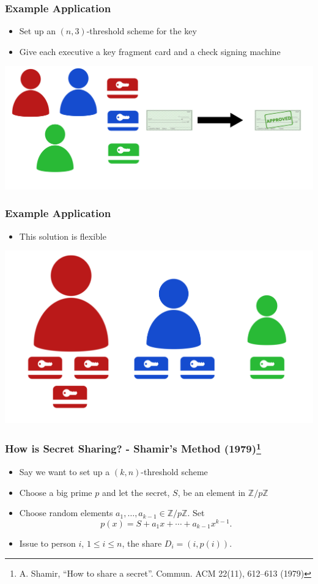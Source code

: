 \documentclass{beamer}
\newcommand{\integers}{\mathbb{Z}}
\begin{document}
\begin{frame}
	\frametitle{Example Application}
	\begin{itemize}
		\item Set up an $(n,3)$-threshold scheme for the key\pause
		\item Give each executive a key fragment card and a check signing machine\pause
	\end{itemize}
	\vspace{1cm}
	\centering
	\includegraphics[scale=.3]{three_execs.png}
\end{frame}

\begin{frame}
	\frametitle{Example Application}
	\begin{itemize}
		\item This solution is flexible\pause
	\end{itemize}
	\vspace{1cm}
	\centering
	\includegraphics[scale=.2]{exec_levels.png}
\end{frame}

\begin{frame}
	\frametitle{How is Secret Sharing? - Shamir's Method (1979)\footnote{A. Shamir, ``How to share a secret''. Commun. ACM 22(11), 612–613 (1979)}}
	\begin{itemize}
		\item Say we want to set up a $(k,n)$-threshold scheme\pause
		\item Choose a big prime $p$ and let the secret, $S$, be an element in $\integers/p\integers$\pause
		\item Choose random elements $a_1, \ldots, a_{k-1}\in \integers/p\integers$. Set
		\[
		p(x) = S + a_1x + \cdots + a_{k-1}x^{k-1}.
		\]\pause
		\item Issue to person $i$, $1\leq i\leq n$, the share $D_i = (i, p(i))$.
	\end{itemize}
\end{frame}
\end{document}
